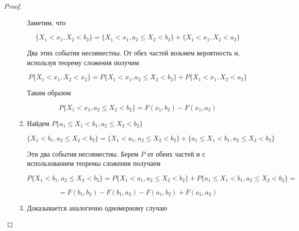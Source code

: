 \documentclass[a4paper, 14pt]{report}
\begin{document}
\begin{proof}
\begin{enumerate}
\begin{enumerate}
                    Заметим, что

                    $$
                    \{X_1 < x_1, X_2 < b_2\} = \{X_1 < x_1, a_2 \le X_2 < b_2\} + \{X_1 < x_1, X_2 < a_2\}
                    $$

                    Два этих события несовместны. От обех частей возьмем вероятность и, используя теорему сложения получим

                    $$
                    P\{X_1 < x_1, X_2 < x_2\} = P\{X_1 < x_1, a_2 \le X_2 < b_2\} + P\{X_1 < x_1, X_2 < a_2\}
                    $$

                    Таким образом

                    $$
                    P\{ X_1 < x_1, a_2 \le X_2 < b_2 \} = F(x_1, b_2) - F(x_1, a_2)
                    $$

                \item Найдем $P\{a_1 \le X_1 < b_1, a_2 \le X_2 < b_2\}$

                    $$
                    \{ X_1 < b_1, a_2 \le X_2 < b_2 \} = \{ X_1 < a_1, a_2 \le X_2 < b_2\} + \{ a_1 \le X_1 < b_1, a_2 \le X_2 < b_2 \}
                    $$

                    Эти два события несовместны. Берем $P$ от обеих частей и с использованием теоремы сложения получаем

                    $$
                    P\{X_1 < b_1, a_2 \le X_2 < b_2\} = P\{ X_1 < a_1, a_2 \le X_2 < b_2 \} + P\{ a_1 \le X_1 < b_1, a_2 \le X_2 < b_2 \} =
                    $$


                    $$
                    = F(b_1, b_2) - F(b_1, a_2) - F(a_1, b_2) + F(a_1, a_2)
                    $$

                \item Доказывается аналогично одномерному случаю
            \end{enumerate}
    \end{enumerate}
\end{proof}
\end{document}
